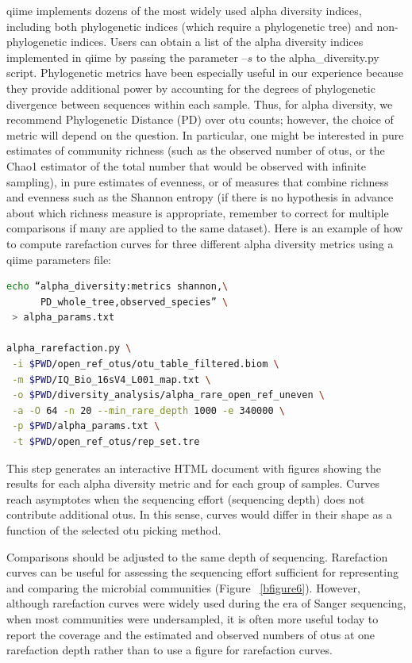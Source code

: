 \gls{qiime} implements dozens of the most widely used alpha diversity indices, including both
phylogenetic indices (which require a phylogenetic tree) and non-phylogenetic indices. Users
can obtain a list of the alpha diversity indices implemented in \gls{qiime} by passing the parameter
$–s$ to the alpha\_diversity.py script. Phylogenetic metrics have been especially useful
in our experience because they provide additional power by accounting for the degrees of
phylogenetic divergence between sequences within each sample. Thus, for alpha diversity,
we recommend Phylogenetic Distance (PD) \cite{Faith1992} over \gls{otu} counts; however, the choice
of metric will depend on the question. In particular, one might be interested in pure
estimates of community richness (such as the observed number of \gls{otu}s, or the Chao1 estimator
of the total number that would be observed with infinite sampling), in pure estimates of
evenness, or of measures that combine richness and evenness such as the Shannon entropy
(if there is no hypothesis in advance about which richness measure is appropriate, remember
to correct for multiple comparisons if many are applied to the same dataset). Here is an example
of how to compute rarefaction curves for three different alpha diversity metrics using a \gls{qiime} parameters file:

\begin{lstlisting}[language=bash]
echo “alpha_diversity:metrics shannon,\
      PD_whole_tree,observed_species” \
 > alpha_params.txt

alpha_rarefaction.py \
 -i $PWD/open_ref_otus/otu_table_filtered.biom \
 -m $PWD/IQ_Bio_16sV4_L001_map.txt \
 -o $PWD/diversity_analysis/alpha_rare_open_ref_uneven \
 -a -O 64 -n 20 --min_rare_depth 1000 -e 340000 \
 -p $PWD/alpha_params.txt \
 -t $PWD/open_ref_otus/rep_set.tre
\end{lstlisting}

This step generates an interactive HTML document with figures showing the
results for each alpha diversity metric and for each group of samples. Curves
reach asymptotes when the sequencing effort (sequencing depth) does not contribute
additional \gls{otu}s. In this sense, curves would differ in their shape as a function
of the selected \gls{otu} picking method.

Comparisons should be adjusted to the same depth of sequencing. Rarefaction curves
can be useful for assessing the sequencing effort sufficient for representing and
comparing the microbial communities (Figure ~\ref{bfigure6}). However, although
rarefaction curves were widely used during the era of Sanger sequencing, when most
communities were undersampled, it is often more useful today to report the coverage
and the estimated and observed numbers of \gls{otu}s at one rarefaction depth rather than
to use a figure for rarefaction curves.

